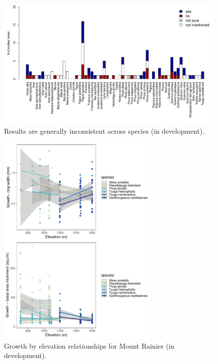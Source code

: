 \documentclass[11pt]{article}
\begin{document}
\clearpage
\begin{figure}[h!]
\includegraphics[width=1\textwidth]{..//figures/speciesnums_finds.pdf}
\caption{Results are generally inconsistent across species (in development).}
\label{fig:sppfinds}
\end{figure}

\clearpage
\begin{figure}[h!]
\includegraphics[width=0.7\textwidth]{..//analyses/growthxelevationetc/figures/grbyelev_rwvsbai_big}
\caption{Growth by elevation relationships for Mount Rainier (in development).}
\label{fig:growelevMORA}
\end{figure}
\end{document}
